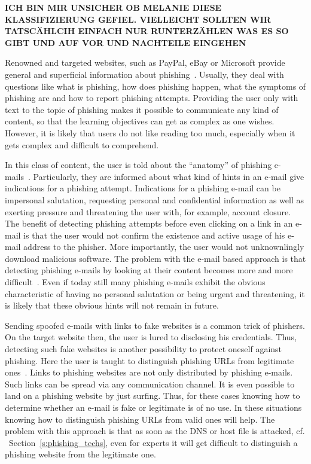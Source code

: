 \textbf{ICH BIN MIR UNSICHER OB MELANIE DIESE KLASSIFIZIERUNG GEFIEL.
 VIELLEICHT SOLLTEN WIR TATSCÄHLCIH EINFACH NUR RUNTERZÄHLEN WAS ES SO GIBT UND AUF VOR UND NACHTEILE EINGEHEN}
\begin{description}[leftmargin=0cm]
	\item[General Knowledge Transfer] Renowned and targeted websites, such as PayPal, eBay or Microsoft provide general and superficial information about phishing~\cite{generalknowledgemicrosoft, generalknowledgepaypal, generalknowledgeebay}. Usually, they deal with questions like what is phishing, how does phishing happen, what the symptoms of phishing are and how to report phishing attempts.
 Providing the user only with text to the topic of phishing makes it possible to communicate any kind of content, so that the learning objectives can get as complex as one wishes.
 However, it is likely that users do not like reading too much, especially when it gets complex and difficult to comprehend.

	\item[E-Mail Based Knowledge] In this class of content, the user is told about the ``anatomy'' of phishing e-mails~\cite{antiphishingphyllis, sonicwall}. Particularly, they are informed about what kind of hints in an e-mail give indications for a phishing attempt.
 Indications for a phishing e-mail can be impersonal salutation, requesting personal and confidential information as well as exerting pressure and threatening the user with, for example, account closure.
 The benefit of detecting phishing attempts before even clicking on a link in an e-mail is that the user would not confirm the existence and active usage of his e-mail address to the phisher.
 More importantly, the user would not unknownlingly download malicious software.
 The problem with the e-mail based approach is that detecting phishing e-mails by looking at their content becomes more and more difficult~\cite{microsoftphishing,spamfighter}. Even if today still many phishing e-mails exhibit the obvious characteristic of having no personal salutation or being urgent and threatening, it is likely that these obvious hints will not remain in future.

	\item[URL Based Knowledge] Sending spoofed e-mails with links to fake websites is a common trick of phishers.
 On the target website then, the user is lured to disclosing his credentials.
 Thus, detecting such fake websites is another possibility to protect oneself against phishing.
 Here the user is taught to distinguish phishing URLs from legitimate ones~\cite{sheng2007antiphishingphil, arachchilage2012designing}. Links to phishing websites are not only distributed by phishing e-mails.
 Such links can be spread via any communication channel.
 It is even possible to land on a phishing website by just surfing.
 Thus, for these cases knowing how to determine whether an e-mail is fake or legitimate is of no use.
 In these situations knowing how to distinguish phishing URLs from valid ones will help.
 The problem with this approach is that as soon as the DNS or host file is attacked, cf.
~Section~\ref{s:phishing_techs}, even for experts it will get difficult to distinguish a phishing website from the legitimate one.


\end{description}
